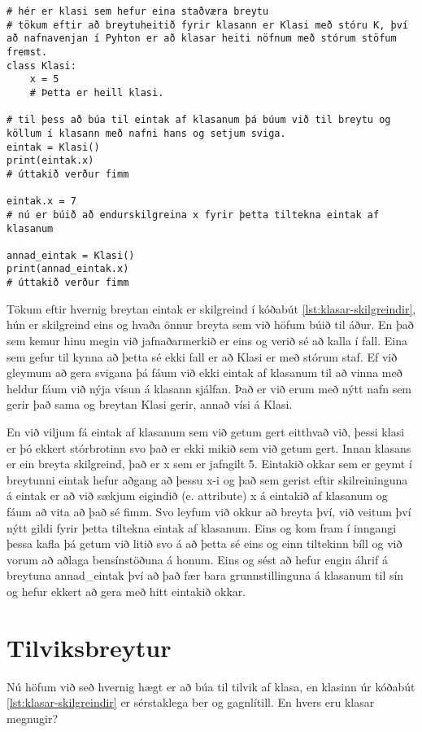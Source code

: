 \begin{lstlisting}[caption=Klasar skilgreindir, label=lst:klasar-skilgreindir]
# hér er klasi sem hefur eina staðværa breytu
# tökum eftir að breytuheitið fyrir klasann er Klasi með stóru K, því að nafnavenjan í Pyhton er að klasar heiti nöfnum með stórum stöfum fremst.
class Klasi:
	x = 5
	# Þetta er heill klasi.
	
# til þess að búa til eintak af klasanum þá búum við til breytu og köllum í klasann með nafni hans og setjum sviga.
eintak = Klasi()
print(eintak.x)
# úttakið verður fimm

eintak.x = 7
# nú er búið að endurskilgreina x fyrir þetta tiltekna eintak af klasanum

annad_eintak = Klasi()
print(annad_eintak.x)
# úttakið verður fimm 
\end{lstlisting}

Tökum eftir hvernig breytan eintak er skilgreind í kóðabút \ref{lst:klasar-skilgreindir}, hún er skilgreind eins og hvaða önnur breyta sem við höfum búið til áður.
En það sem kemur hinu megin við jafnaðarmerkið er eins og verið sé að kalla í fall.
Eina sem gefur til kynna að þetta sé ekki fall er að Klasi er með stórum staf.
Ef við gleymum að gera svigana þá fáum við ekki eintak af klasanum til að vinna með heldur fáum við nýja vísun á klasann sjálfan.
Það er við erum með nýtt nafn sem gerir það sama og breytan Klasi gerir, annað vísi á Klasi.

En við viljum fá eintak af klasanum sem við getum gert eitthvað við, þessi klasi er þó ekkert stórbrotinn svo það er ekki mikið sem við getum gert.
Innan klasans er ein breyta skilgreind, það er x sem er jafngilt 5.
Eintakið okkar sem er geymt í breytunni eintak hefur aðgang að þessu x-i og það sem gerist eftir skilreininguna á eintak er að við sækjum eigindið (e. attribute) x á eintakið af klasanum og fáum að vita að það sé fimm.
Svo leyfum við okkur að breyta því, við veitum því nýtt gildi fyrir þetta tiltekna eintak af klasanum.
Eins og kom fram í inngangi þessa kafla þá getum við litið svo á að þetta sé eins og einn tiltekinn bíll og við vorum að aðlaga bensínstöðuna á honum.
Eins og sést að hefur engin áhrif á breytuna annad\_eintak því að það fær bara grunnstillinguna á klasanum til sín og hefur ekkert að gera með hitt eintakið okkar.

\section{Tilviksbreytur}\label{uk:klasar-tilviksbreytur}
Nú höfum við seð hvernig hægt er að búa til tilvik af klasa, en klasinn úr kóðabút \ref{lst:klasar-skilgreindir} er sérstaklega ber og gagnlítill.
En hvers eru klasar megnugir?

